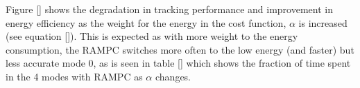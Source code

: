 Figure \ref{} shows the degradation in tracking performance and improvement in energy efficiency as the weight for the energy in the cost function, $\alpha$ is increased (see equation \ref{}). This is expected as with more weight to the energy consumption, the RAMPC switches more often to the low energy (and faster) but less accurate mode 0, as is seen in table \ref{} which shows the fraction of time spent in the 4 modes with RAMPC as $\alpha$ changes. 
